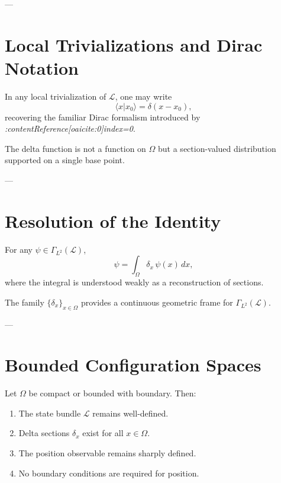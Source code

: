 \documentclass[11pt]{article}
\begin{document}
---

\section{Local Trivializations and Dirac Notation}

In any local trivialization of $\mathcal L$, one may write
\[
\langle x | x_0 \rangle = \delta(x-x_0),
\]
recovering the familiar Dirac formalism introduced by
\emph{:contentReference[oaicite:0]{index=0}}.

\begin{remark}
The delta function is not a function on $\Omega$ but a section-valued
distribution supported on a single base point.
\end{remark}

---

\section{Resolution of the Identity}

\begin{theorem}
For any $\psi \in \Gamma_{L^2}(\mathcal L)$,
\[
\psi = \int_\Omega \delta_x \, \psi(x)\, dx,
\]
where the integral is understood weakly as a reconstruction of sections.
\end{theorem}

\begin{corollary}
The family $\{\delta_x\}_{x\in\Omega}$ provides a continuous geometric frame
for $\Gamma_{L^2}(\mathcal L)$.
\end{corollary}

---

\section{Bounded Configuration Spaces}

\begin{theorem}
Let $\Omega$ be compact or bounded with boundary.
Then:
\begin{enumerate}
\item The state bundle $\mathcal L$ remains well-defined.
\item Delta sections $\delta_x$ exist for all $x\in\Omega$.
\item The position observable remains sharply defined.
\item No boundary conditions are required for position.
\end{enumerate}
\end{theorem}
\end{document}
